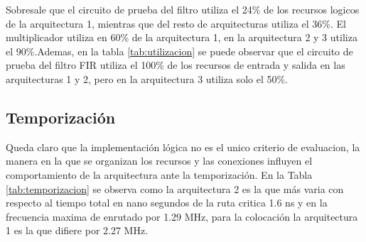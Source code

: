 Sobresale que el circuito de prueba del filtro utiliza el 24\% de los recursos logicos de la arquitectura 1, mientras que del resto de arquitecturas utiliza el 36\%. El multiplicador utiliza en 60\% de la arquitectura 1, en la arquitectura 2 y 3 utiliza el 90\%.Ademas, en la tabla \ref{tab:utilizacion} se puede observar que el circuito de prueba del filtro FIR utiliza el 100\% de los recursos de entrada y salida en las arquitecturas 1 y 2, pero en la arquitectura 3 utiliza solo el 50\%. 

\subsection{Temporización}

\begin{table}[H]
  \centering
  \caption{Resultados de temporización de nextpnr.}
  \label{tab:temporizacion}
\end{table}

Queda claro que la implementación lógica no es el unico criterio de evaluacion, la manera en la que se organizan los recursos y las conexiones influyen el comportamiento de la arquitectura ante la temporización. En la Tabla \ref{tab:temporizacion} se observa como la arquitectura 2 es la que más varia con respecto al tiempo total en nano segundos de la ruta critica 1.6 ns y en la frecuencia maxima de enrutado por 1.29 MHz, para la colocación la arquitectura 1 es la que difiere por 2.27 MHz.

